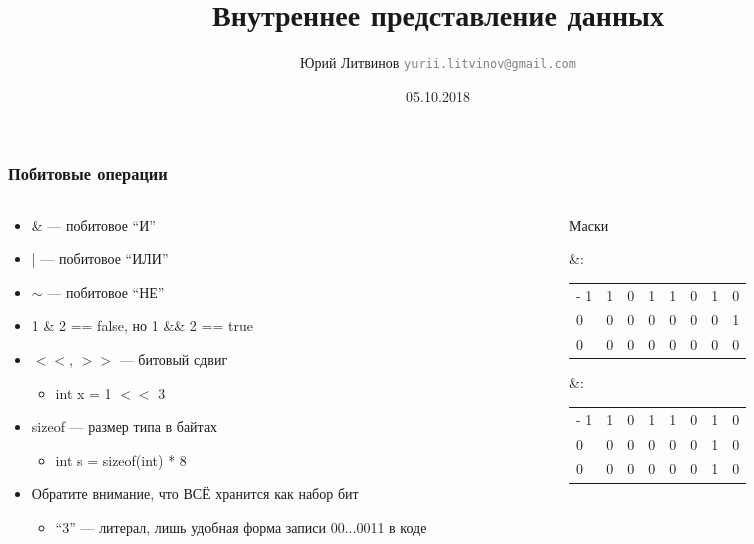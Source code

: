 \documentclass[xetex,mathserif,serif]{beamer}
\title{Внутреннее представление данных}
\author[Юрий Литвинов]{Юрий Литвинов \newline \textcolor{gray}{\small\texttt{yurii.litvinov@gmail.com}}}
\date{05.10.2018}
\begin{document}
	
	\frame{\titlepage}
	
	\begin{frame}
		\frametitle{Побитовые операции}
		\begin{columns}
			\begin{column}{0.6\textwidth}
				\begin{itemize}
					\item \& --- побитовое ``И''
					\item | --- побитовое ``ИЛИ''
					\item $\sim$ --- побитовое ``НЕ''
					\item 1 \& 2 == false, но 1 \&\& 2 == true
					\item $<<$, $>>$ --- битовый сдвиг
					\begin{itemize}
						\item int x = 1 $<<$ 3
					\end{itemize}
					\item sizeof --- размер типа в байтах
					\begin{itemize}
						\item int s = sizeof(int) * 8
					\end{itemize}
					\item Обратите внимание, что ВСЁ хранится как набор бит
					\begin{itemize}
						\item ``3'' --- литерал, лишь удобная форма записи 00...0011 в коде
					\end{itemize}
				\end{itemize}
			\end{column}
			\begin{column}{0.4\textwidth}
				Маски
				
				\&:
				\vspace{0.1cm}
				
				\begin{tabu} {| X[1 l p] | X[1 l p] | X[1 l p] | X[1 l p] | X[1 l p] | X[1 l p] | X[1 l p] | X[1 l p] |}
					\tabucline-
					\everyrow{\tabucline-}
					1 & 1 & 0 & 1 & 1 & 0 & 1 & 0 \\
					0 & 0 & 0 & 0 & 0 & 0 & 0 & 1 \\
					0 & 0 & 0 & 0 & 0 & 0 & 0 & 0 \\
				\end{tabu}
				\vspace{0.5cm}

				\&:
				\vspace{0.1cm}

				\begin{tabu} {| X[1 l p] | X[1 l p] | X[1 l p] | X[1 l p] | X[1 l p] | X[1 l p] | X[1 l p] | X[1 l p] |}
					\tabucline-
					\everyrow{\tabucline-}
					1 & 1 & 0 & 1 & 1 & 0 & 1 & 0 \\
					0 & 0 & 0 & 0 & 0 & 0 & 1 & 0 \\
					0 & 0 & 0 & 0 & 0 & 0 & 1 & 0 \\
				\end{tabu}
			\end{column}
		\end{columns}
	\end{frame}
\end{document}
